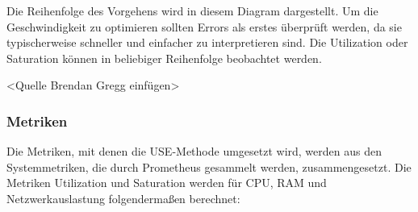 \documentclass[a4paper,10pt]{scrartcl}
\begin{document}
Die Reihenfolge des Vorgehens wird in diesem Diagram dargestellt. Um die Geschwindigkeit zu optimieren sollten Errors als erstes überprüft werden, da sie typischerweise schneller und einfacher zu interpretieren sind. Die Utilization oder Saturation können in beliebiger Reihenfolge beobachtet werden.

<Quelle Brendan Gregg einfügen>
\pagebreak

\subsubsection{Metriken}

Die Metriken, mit denen die USE-Methode umgesetzt wird, werden aus den Systemmetriken, die durch Prometheus gesammelt werden, zusammengesetzt. 
Die Metriken Utilization und Saturation werden für CPU, RAM und Netzwerkauslastung folgendermaßen berechnet:
\end{document}
